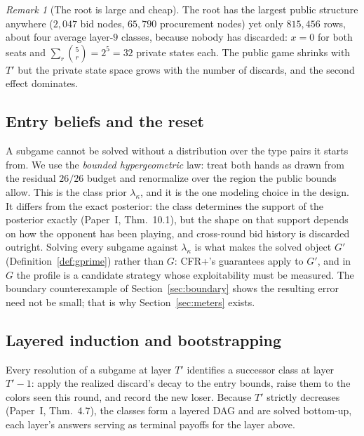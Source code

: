 \documentclass[11pt]{article}
\theoremstyle{plain}
\theoremstyle{definition}
\theoremstyle{remark}
\newtheorem{remark}[theorem]{Remark}
\newcommand{\game}{\ensuremath{G}}
\newcommand{\gp}{\ensuremath{G'}}
\begin{document}
\begin{remark}[The root is large and cheap]\label{rem:rootcheap}
The root has the largest public structure anywhere ($2{,}047$ bid
nodes, $65{,}790$ procurement nodes) yet only $815{,}456$ rows, about
four average layer-$9$ classes, because nobody has discarded: $x=0$
for both seats and $\sum_r\binom{5}{r}=2^5=32$ private states each.
The public game shrinks with $T'$ but the private state space grows
with the number of discards, and the second effect dominates.
\end{remark}

\subsection{Entry beliefs and the reset}\label{sec:entrybeliefs}

A subgame cannot be solved without a distribution over the type pairs it starts
from. We use the \emph{bounded hypergeometric} law: treat both hands as drawn
from the residual $26/26$ budget and renormalize over the region the public
bounds allow. This is the class prior $\lambda_\kappa$, and it is the one
modeling choice in the design. It differs from the exact posterior: the class
determines the support of the posterior exactly (Paper~I, Thm.~10.1), but the
shape on that support depends on how the opponent has been playing, and
cross-round bid history is discarded outright. Solving every subgame against
$\lambda_\kappa$ is what makes the solved object $\gp$
(Definition~\ref{def:gprime}) rather than $\game$: CFR+'s guarantees apply to
$\gp$, and in $\game$ the profile is a candidate strategy whose exploitability
must be measured. The boundary counterexample of Section~\ref{sec:boundary}
shows the resulting error need not be small; that is why
Section~\ref{sec:meters} exists.

\subsection{Layered induction and bootstrapping}\label{sec:induction}

Every resolution of a subgame at layer $T'$ identifies a successor class at
layer $T'-1$: apply the realized discard's decay to the entry bounds, raise them
to the colors seen this round, and record the new loser. Because $T'$ strictly
decreases (Paper~I, Thm.~4.7), the classes form a layered DAG and are solved
bottom-up, each layer's answers serving as terminal payoffs for the layer above.
\end{document}
